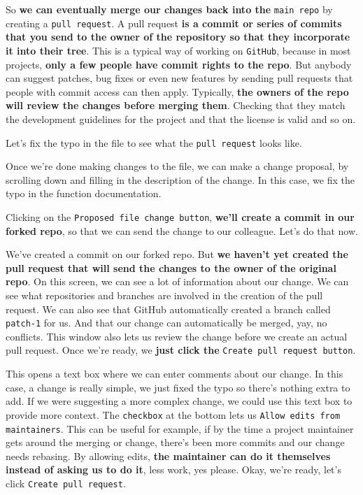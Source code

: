 	So \textbf{we can eventually merge our changes back into the} \texttt{main repo} by creating a \texttt{pull request}. A pull request \textbf{is a commit or series of commits that you send to the owner of the repository so that they incorporate it into their tree}. This is a typical way of working on \texttt{GitHub}, because in most projects, \textbf{only a few people have commit rights to the repo}. 
	But anybody can suggest patches, bug fixes or even new features by sending pull requests that people with commit access can then apply. Typically, \textbf{the owners of the repo will review the changes before merging them}. Checking that they match the development guidelines for the project and that the license is valid and so on. 
	
	Let's fix the typo in the file to see what the \texttt{pull request} looks like.
	
	Once we're done making changes to the file, we can make a change proposal, by scrolling down and filling in the description of the change. In this case, we fix the typo in the function documentation.
	
	Clicking on the \texttt{Proposed file change button},\textbf{ we'll create a commit in our forked repo}, so that we can send the change to our colleague. Let's do that now.
	
	We've created a commit on our forked repo. But\textbf{ we haven't yet created the pull request that will send the changes to the owner of the original repo}. On this screen, we can see a lot of information about our change. We can see what repositories and branches are involved in the creation of the pull request. We can also see that GitHub automatically created a branch called \verb|patch-1| for us. And that our change can automatically be merged, yay, no conflicts. This window also lets us review the change before we create an actual pull request. Once we're ready, we \textbf{just click the} \texttt{Create pull request button}.
	
	This opens a text box where we can enter comments about our change. In this case, a change is really simple, we just fixed the typo so there's nothing extra to add. If we were suggesting a more complex change, we could use this text box to provide more context. The \texttt{checkbox} at the bottom lets us \texttt{Allow edits from maintainers}. This can be useful for example, if by the time a project maintainer gets around the merging or change, there's been more commits and our change needs rebasing. By allowing edits, \textbf{the maintainer can do it themselves instead of asking us to do it}, less work, yes please. Okay, we're ready, let's click \texttt{Create pull request}.
	
